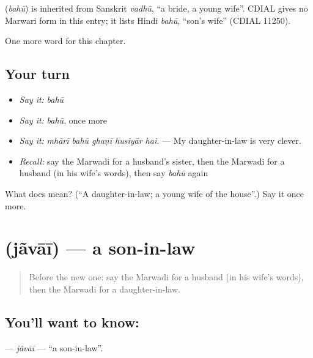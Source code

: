 \begin{cousinweb}
\textbf{} (\emph{bahū}) is inherited from Sanskrit \emph{vadhū}, \textquotedblleft{}a bride, a young wife\textquotedblright{}. CDIAL gives no Marwari form in this entry; it lists Hindi \emph{bahū}, \textquotedblleft{}son's wife\textquotedblright{} (CDIAL 11250).
\end{cousinweb}

\begin{grammarlens}[title={What you've built}]
One more word for this chapter.
\end{grammarlens}

\subsection*{Your turn}
\begin{itemize}
\raggedright
  \item \emph{Say it:} \emph{bahū}
  \item \emph{Say it:} \emph{bahū}, once more
  \item \emph{Say it:} \emph{mhārī bahū ghaṇī husiyār hai.} — My daughter-in-law is very clever.
  \item \emph{Recall:} say the Marwadi for a husband's sister, then the Marwadi for a husband (in his wife's words), then say \emph{bahū} again
\end{itemize}

\begin{tcolorbox}[breakable,colback=teal!4,colframe=teal!35!black,title={Before you move on}]
What does  mean? (\textquotedblleft{}A daughter-in-law; a young wife of the house\textquotedblright{}.) Say it once more.
\end{tcolorbox}
\section[\texorpdfstring{\mw{जंवाई} (jãvāī)}{जंवाई (jãvāī)}]{ (jãvāī) — a son-in-law}

\label{lesson:MW-C260-javai}



\begin{quote}
Before the new one: say the Marwadi for a husband (in his wife's words), then the Marwadi for a daughter-in-law.
\end{quote}

\subsection*{You'll want to know: }
\textbf{} — \emph{jãvāī} — \textquotedblleft{}a son-in-law\textquotedblright{}.

